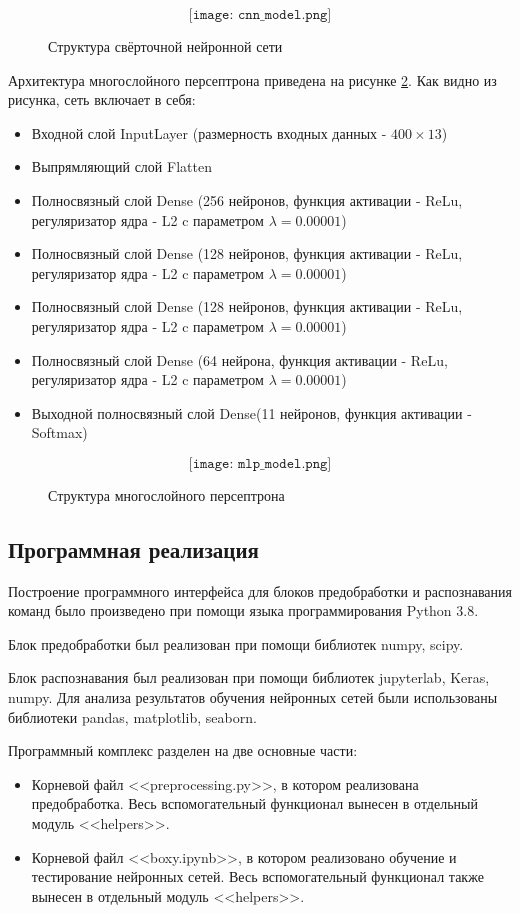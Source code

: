\begin{figure}[H]
	\[\texttt{[image: cnn\_model.png]}\]
	\caption{Структура свёрточной нейронной сети}
	\label{fig:cnn_model}
\end{figure}

Архитектура многослойного персептрона приведена на рисунке \ref{fig:mlp_model}. Как видно из рисунка, сеть включает в себя:
\begin{itemize}[leftmargin=2cm]
	\item Входной слой InputLayer (размерность входных данных - $400 \times 13$)
	\item Выпрямляющий слой Flatten
	\item Полносвязный слой Dense (256 нейронов, функция активации - ReLu, регуляризатор ядра - L2 c параметром $\lambda = 0.00001$)
	\item Полносвязный слой Dense (128 нейронов, функция активации - ReLu, регуляризатор ядра - L2 c параметром $\lambda = 0.00001$)
	\item Полносвязный слой Dense (128 нейронов, функция активации - ReLu, регуляризатор ядра - L2 c параметром $\lambda = 0.00001$)
	\item Полносвязный слой Dense (64 нейрона, функция активации - ReLu, регуляризатор ядра - L2 c параметром $\lambda = 0.00001$)
	\item Выходной полносвязный слой Dense(11 нейронов, функция активации - Softmax)
\end{itemize}

\begin{figure}[H]
	\[\texttt{[image: mlp\_model.png]}\]
	\caption{Структура многослойного персептрона}
	\label{fig:mlp_model}
\end{figure}

\subsection{Программная реализация}
Построение программного интерфейса для блоков предобработки и распознавания команд было произведено при помощи языка программирования Python 3.8.

Блок предобработки был реализован при помощи библиотек numpy, scipy. 

Блок распознавания был реализован при помощи библиотек jupyterlab, Keras, numpy. Для анализа результатов обучения нейронных сетей были использованы библиотеки pandas, matplotlib, seaborn.

Программный комплекс разделен на две основные части:
\begin{itemize}[leftmargin=2cm]
	\item Корневой файл <<preprocessing.py>>, в котором реализована предобработка. Весь вспомогательный функционал вынесен в отдельный модуль <<helpers>>.
	\item Корневой файл <<boxy.ipynb>>, в котором реализовано обучение и тестирование нейронных сетей. Весь вспомогательный функционал также вынесен в отдельный модуль <<helpers>>.
\end{itemize}

